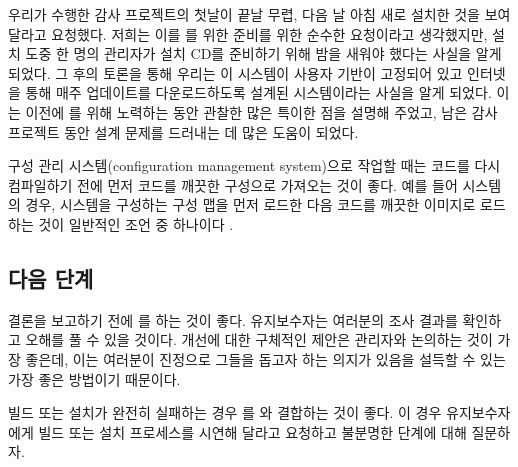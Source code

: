 \documentclass[a4paper,10pt,twoside]{book}
\begin{document}
우리가 수행한 감사 프로젝트의 첫날이 끝날 무렵, 다음 날 아침 새로 설치한 것을 보여 달라고 요청했다. 저희는 이를 를 위한 준비를 위한 순수한 요청이라고 생각했지만, 설치 도중 한 명의 관리자가 설치 CD를 준비하기 위해 밤을 새워야 했다는 사실을 알게 되었다. 그 후의 토론을 통해 우리는 이 시스템이 사용자 기반이 고정되어 있고 인터넷을 통해 매주 업데이트를 다운로드하도록 설계된 시스템이라는 사실을 알게 되었다. 이는 이전에 를 위해 노력하는 동안 관찰한 많은 특이한 점을 설명해 주었고, 남은 감사 프로젝트 동안 설계 문제를 드러내는 데 많은 도움이 되었다.

구성 관리 시스템(configuration management system)으로 작업할 때는 코드를 다시 컴파일하기 전에 먼저 코드를 깨끗한 구성으로 가져오는 것이 좋다. 예를 들어  시스템의 경우, 시스템을 구성하는  구성 맵을 먼저 로드한 다음 코드를 깨끗한 이미지로 로드하는 것이 일반적인 조언 중 하나이다 \cite{Pelr01a}. 

\subsection*{다음 단계}

결론을 보고하기 전에 를 하는 것이 좋다. 유지보수자는 여러분의 조사 결과를 확인하고 오해를 풀 수 있을 것이다. 개선에 대한 구체적인 제안은 관리자와 논의하는 것이 가장 좋은데, 이는 여러분이 진정으로 그들을 돕고자 하는 의지가 있음을 설득할 수 있는 가장 좋은 방법이기 때문이다.

빌드 또는 설치가 완전히 실패하는 경우 를 와 결합하는 것이 좋다. 이 경우 유지보수자에게 빌드 또는 설치 프로세스를 시연해 달라고 요청하고 불분명한 단계에 대해 질문하자.

\ifx\wholebook\relax\else
   
   
   
\end{document}
